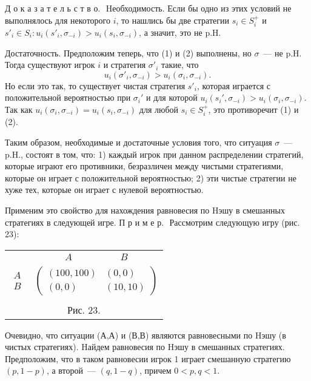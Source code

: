\documentclass[12pt]{article}
\begin{document}
{Д о к а з а т е л ь с т в о.\,\, Hеобходимость. Если бы одно из этих
условий не выполнялось для некоторого $i$, то нашлись бы две
стратегии $s_i\in S^+_i$ и $s'_i\in S_i:u_i(s'_i,\sigma_{-i})>
u_i(s_i, \sigma_{- i})$, а значит, это не p.H.

Достаточность. Предположим теперь, что (1) и (2) выполнены, но
$\sigma$~--- не  p.H. Тогда существуют игрок $i$ и стратегия
$\sigma'_i$ такие, что
$$
u_i(\sigma'_i,\sigma_{-i})>u_i(\sigma_i,\sigma_{-i}).
$$
Но если это так, то существует чистая стратегия $s'_i$, которая
играется с положительной вероятностью при $\sigma_i'$ и для которой
$u_i(s_i',\sigma_{-i})> u_i(\sigma_i,\sigma_{-i})$. Так как
$u_i(\sigma_i,\sigma_{-i})=u_i(s_i, \sigma_{-i})$ для любой $s_i\in
S^+_i$, это противоречит (1) и (2).

Таким  образом, необходимые и  достаточные условия того, что
ситуация $\sigma$~--- p.H., состоят в том, что: 1) каждый игрок при
данном распределении стратегий, которые играют его противники,
безразличен между чистыми стратегиями, которые он играет с
положительной вероятностью; 2) эти чистые стратегии  не хуже тех,
которые он играет с нулевой вероятностью.

Применим это свойство для нахождения равновесия по Hэшу в смешанных
стратегиях в следующей игре.
\smallskip
\clearpage П р и м е р.\,\, Рассмотрим следующую игру (рис.\,23):

\begin{center}
\begin{tabular}{cc}
&$\begin{array}{cc} A\qquad&\qquad\, B\end{array}$\\
$\begin{array}{c} A\\ B\end{array}$& $\left(\begin{array}{cc}
(100,100)& (0,0)\\
(0,0)&(10,10)\end{array}\right)$\\
\multicolumn{2}{c}{}\\
\multicolumn{2}{c}{Рис. 23.}\\
\end{tabular}
\end{center}

Очевидно, что ситуации (А,А) и (В,В) являются равновесными по Hэшу
(в чистых стратегиях). Hайдем равновесия по Hэшу в смешанных
стратегиях. Предположим, что в таком равновесии игрок 1 играет
смешанную стратегию $(p,1-p)$, а второй~--- $(q,1-q)$, причем
$0<p,q<1$.

}
\end{document}
